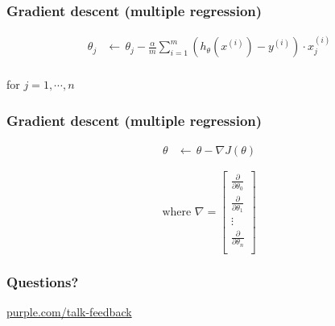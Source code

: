 \begin{frame}
  \frametitle{Gradient descent (multiple regression)}

  \begin{bphrase}
    \begin{align*}
      \theta_j & \leftarrow\, \theta_j - \frac{\alpha}{m} \sum_{i=1}^m
                 \left(h_{\theta}(x^{(i)}) - y^{(i)}\right) \cdot x_j^{(i)} \\
    \end{align*}
    \centerline{for $j=1, \cdots, n$}
  \end{bphrase}
\end{frame}

\begin{frame}
  \frametitle{Gradient descent (multiple regression)}

  \begin{bphrase}
    \begin{align*}
      \theta & \leftarrow\, \theta - \nabla J(\theta)
    \end{align*}

    \begin{displaymath}
      \mbox{where } \nabla =
      \begin{bmatrix}
        \frac{\partial}{\partial\theta_0} \\[2mm]
        \frac{\partial}{\partial\theta_1} \\[2mm]
        \vdots\\[2mm]
        \frac{\partial}{\partial\theta_n} \\
      \end{bmatrix}
    \end{displaymath}
  \end{bphrase}
\end{frame}

\begin{frame}
  \frametitle{}

\end{frame}

\begin{frame}
  \frametitle{}

\end{frame}


\begin{frame}
  \frametitle{Questions?}
  \centerline{\large\url{purple.com/talk-feedback}}
\end{frame}


